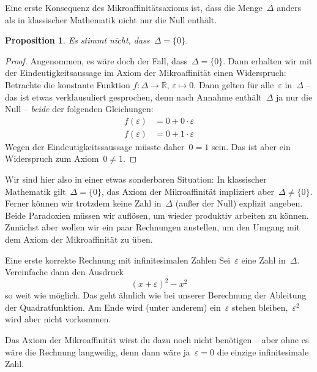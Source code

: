 \documentclass[twoside]{../zirkelblatt}
\newcommand{\RR}{\mathbb{R}}
\theoremstyle{definition}
\theoremstyle{plain}
\newtheorem{prop}[defn]{Proposition}
\theoremstyle{remark}
\begin{document}
Eine erste Konsequenz des Mikroaffinitätsaxioms ist, dass die Menge~$\Delta$
anders als in klassischer Mathematik nicht nur die Null enthält.
\begin{prop}\label{prop:neg-delta0}Es stimmt nicht, dass~$\Delta = \{ 0 \}$.\end{prop}
\begin{proof}Angenommen, es wäre doch der Fall, dass~$\Delta = \{ 0 \}$. Dann
erhalten wir mit der Eindeutigkeitsaussage im Axiom der Mikroaffinität einen
Widerspruch: Betrachte die konstante Funktion $f : \Delta \to \RR,\,\varepsilon \mapsto 0$.
Dann gelten für alle~$\varepsilon$ in~$\Delta$ -- das ist etwas verklausuliert
gesprochen, denn nach Annahme enthält~$\Delta$ ja nur die Null -- \emph{beide}
der folgenden Gleichungen:
\begin{align*}
  f(\varepsilon) &= 0 + 0 \cdot \varepsilon \\
  f(\varepsilon) &= 0 + 1 \cdot \varepsilon
\end{align*}
Wegen der Eindeutigkeitssaussage müsste daher~$0 = 1$ sein. Das ist aber ein
Widerspruch zum Axiom~$0 \neq 1$.
\end{proof}

Wir\marginpar[\hfill\dbend]{\dbend} sind hier also in einer etwas sonderbaren Situation: In klassischer
Mathematik gilt~$\Delta = \{ 0 \}$, das Axiom der Mikroaffinität impliziert
aber~$\Delta \neq \{ 0 \}$. Ferner können wir trotzdem keine Zahl
in~$\Delta$ (außer der Null) explizit angeben. Beide Paradoxien müssen wir
auflösen, um wieder produktiv arbeiten zu können. Zunächst aber wollen wir ein
paar Rechnungen anstellen, um den Umgang mit dem Axiom der Mikroaffinität zu
üben.

\begin{aufgabeShaded}{Eine erste korrekte Rechnung mit infinitesimalen Zahlen}
\label{aufg:erste-rechnung}
Sei~$\varepsilon$ eine Zahl in~$\Delta$. Vereinfache dann den Ausdruck
\[ (x + \varepsilon)^2 - x^2 \]
so weit wie möglich. Das geht ähnlich wie bei unserer Berechnung der Ableitung
der Quadratfunktion. Am Ende wird (unter anderem) ein~$\varepsilon$ stehen
bleiben,~$\varepsilon^2$ wird aber nicht vorkommen.

Das Axiom der Mikroaffinität wirst du dazu noch nicht benötigen -- aber ohne es
wäre die Rechnung langweilig, denn dann wäre ja~$\varepsilon = 0$ die einzige
infinitesimale Zahl.
\end{aufgabeShaded}
\end{document}

